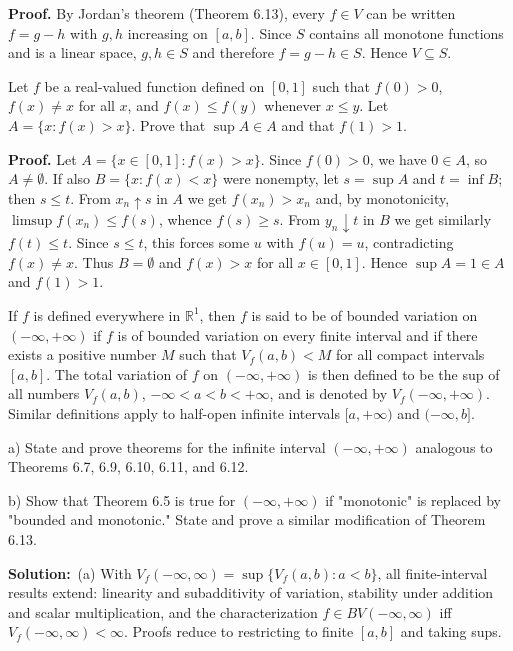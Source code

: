 \noindent\textbf{Proof.}
By Jordan’s theorem (Theorem 6.13), every $f\in V$ can be written $f=g-h$ with $g,h$ increasing on $[a,b]$. Since $S$ contains all monotone functions and is a linear space, $g,h\in S$ and therefore $f=g-h\in S$. Hence $V\subseteq S$.



\begin{problembox}
Let $f$ be a real-valued function defined on $[0, 1]$ such that $f(0) > 0$, $f(x) \neq x$ for all $x$, and $f(x) \leq f(y)$ whenever $x \leq y$. Let $A = \{x: f(x) > x\}$. Prove that $\sup A \in A$ and that $f(1) > 1$.
\end{problembox}

\noindent\textbf{Proof.}
Let $A=\{x\in[0,1]: f(x)>x\}$. Since $f(0)>0$, we have $0\in A$, so $A\neq\emptyset$. If also $B=\{x: f(x)<x\}$ were nonempty, let $s=\sup A$ and $t=\inf B$; then $s\le t$. From $x_n\uparrow s$ in $A$ we get $f(x_n)>x_n$ and, by monotonicity, $\limsup f(x_n)\le f(s)$, whence $f(s)\ge s$. From $y_n\downarrow t$ in $B$ we get similarly $f(t)\le t$. Since $s\le t$, this forces some $u$ with $f(u)=u$, contradicting $f(x)\ne x$. Thus $B=\emptyset$ and $f(x)>x$ for all $x\in[0,1]$. Hence $\sup A=1\in A$ and $f(1)>1$.



\begin{problembox}
If $f$ is defined everywhere in $\mathbb{R}^1$, then $f$ is said to be of bounded variation on $(-\infty, +\infty)$ if $f$ is of bounded variation on every finite interval and if there exists a positive number $M$ such that $V_f(a, b) < M$ for all compact intervals $[a, b]$. The total variation of $f$ on $(-\infty, +\infty)$ is then defined to be the sup of all numbers $V_f(a, b)$, $-\infty < a < b < +\infty$, and is denoted by $V_f(-\infty, +\infty)$. Similar definitions apply to half-open infinite intervals $[a, +\infty)$ and $(-\infty, b]$.

a) State and prove theorems for the infinite interval $(-\infty, +\infty)$ analogous to Theorems 6.7, 6.9, 6.10, 6.11, and 6.12.

b) Show that Theorem 6.5 is true for $(-\infty, +\infty)$ if "monotonic" is replaced by "bounded and monotonic." State and prove a similar modification of Theorem 6.13.
\end{problembox}

\noindent\textbf{Solution:}
\,(a) With $V_f(-\infty,\infty)=\sup\{V_f(a,b): a<b\}$, all finite-interval results extend: linearity and subadditivity of variation, stability under addition and scalar multiplication, and the characterization $f\in BV(-\infty,\infty)$ iff $V_f(-\infty,\infty)<\infty$. Proofs reduce to restricting to finite $[a,b]$ and taking sups.

